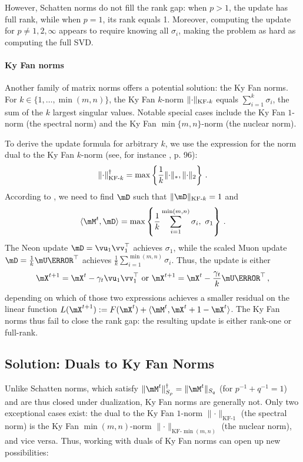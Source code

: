 \documentclass[pmlr]{jmlr}%
\newcommand{\norm}[1]{\lVert #1\rVert}
\DeclarePairedDelimiter{\norms}{\|}{\|_{\mathrm{2}}}
\DeclarePairedDelimiter{\normn}{\|}{\|_{*}}
\DeclarePairedDelimiter{\normkfk}{\|}{\|_{\text{KF-}k}}
\def\<#1,#2>{\langle #1,#2\rangle}
\begin{document}
 However, Schatten norms do not fill the rank gap: when $p > 1$, the update has full rank, while when $p=1$, its rank equals 1. Moreover, computing the update for $p \neq 1, 2, \infty$ appears to require knowing all $\sigma_i$, making the problem as hard as computing the full SVD.
 
 \paragraph{Ky Fan norms}
 Another family of matrix norms offers a potential solution: the Ky Fan norms. For $k \in \{1, \dots, \min(m, n)\}$, the Ky Fan $k$-norm $\normkfk{\cdot}$ equals $\sum_{i=1}^{k}\sigma_i$, the sum of the $k$ largest singular values. Notable special cases include the Ky Fan $1$-norm (the spectral norm) and the Ky Fan $\min\{m, n\}$-norm (the nuclear norm).
 
 To derive the update formula for arbitrary $k$, we use the expression for the norm dual to the Ky Fan $k$-norm (see, for instance \citep{bhatia2013matrix}, p. 96):
 \[
     \normkfk{\cdot}^\dagger = \max\left\{\frac{1}{k} \normn{\cdot}, \norms{\cdot}\right\}\,.
 \]
 According to , we need to find $\mD$ such that $\normkfk{\mD} = 1$ and
 \[
 \<\mM^t, \mD> = \max\left\{\frac{1}{k}\sum_{i=1}^{\min(m,n)}\sigma_i,\ \sigma_1\right\}\,.
 \]
 The Neon update $\mD = \vu_1 \vv_1^\top$ achieves $\sigma_1$, while the scaled Muon update $\mD = \frac{1}{k}\mU\mV^\top$ achieves $\frac{1}{k}\sum_{i=1}^{\min(m,n)}\sigma_i$. Thus, the update is either
 \[
 \mX^{t+1} = \mX^{t} - \gamma_t \vu_1 \vv_1^\top\text{ or }\mX^{t+1} = \mX^{t} - \frac{\gamma_t}{k}\mU \mV^\top\,,
 \]
 depending on which of those two expressions achieves a smaller residual on the linear function $L(\mX^{t+1}) := F(\mX^t) + \<\mM^t, \mX^{t+1} - \mX^t>$. The Ky Fan norms thus fail to close the rank gap: the resulting update is either rank-one or full-rank.
 
 \subsection{Solution: Duals to Ky Fan Norms}
 
 Unlike Schatten norms, which satisfy $\norm{\mM^t}_{S_p}^\dagger = \norm{\mM^t}_{S_q}$ (for $p^{-1} + q^{-1} = 1$) and are thus closed under dualization, Ky Fan norms are generally not. Only two exceptional cases exist: the dual to the Ky Fan $1$-norm $\norm{\cdot}_{\text{KF-}1}$ (the spectral norm) is the Ky Fan $\min(m,n)$-norm $\norm{\cdot}_{\text{KF-}\min(m,n)}$ (the nuclear norm), and vice versa. Thus, working with duals of Ky Fan norms can open up new possibilities:
 
\end{document}
